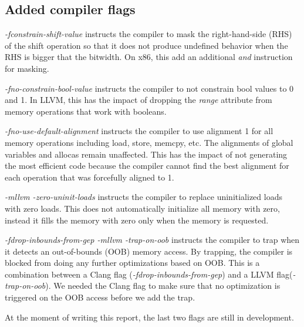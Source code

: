 \subsection{Added compiler flags}

\textit{-fconstrain-shift-value} instructs the compiler to mask the
right-hand-side (RHS) of the shift operation so that it does not produce
undefined behavior when the RHS is bigger that the bitwidth. On x86, this add an
additional \textit{and} instruction for masking.

\textit{-fno-constrain-bool-value} instructs the compiler to not constrain bool
values to 0 and 1. In LLVM, this has the impact of dropping the \textit{range}
attribute from memory operations that work with booleans.

\textit{-fno-use-default-alignment} instructs the compiler to use alignment 1
for all memory operations including load, store, memcpy, etc. The alignments of
global variables and allocas remain unaffected. This has the impact of not
generating the most efficient code because the compiler cannot find the best
alignment for each operation that was forcefully aligned to 1.

\textit{-mllvm -zero-uninit-loads} instructs the compiler to replace
uninitialized loads with zero loads. This does not automatically initialize all
memory with zero, instead it fills the memory with zero only when the memory is
requested.

\textit{-fdrop-inbounds-from-gep -mllvm -trap-on-oob} instructs the compiler to
trap when it detects an out-of-bounds (OOB) memory access. By trapping, the
compiler is blocked from doing any further optimizations based on OOB. This is a
combination between a Clang flag (\textit{-fdrop-inbounds-from-gep}) and a LLVM
flag(\textit{-trap-on-oob}). We needed the Clang flag to make sure that no
optimization is triggered on the OOB access before we add the trap.

At the moment of writing this report, the last two flags are still in
development.
